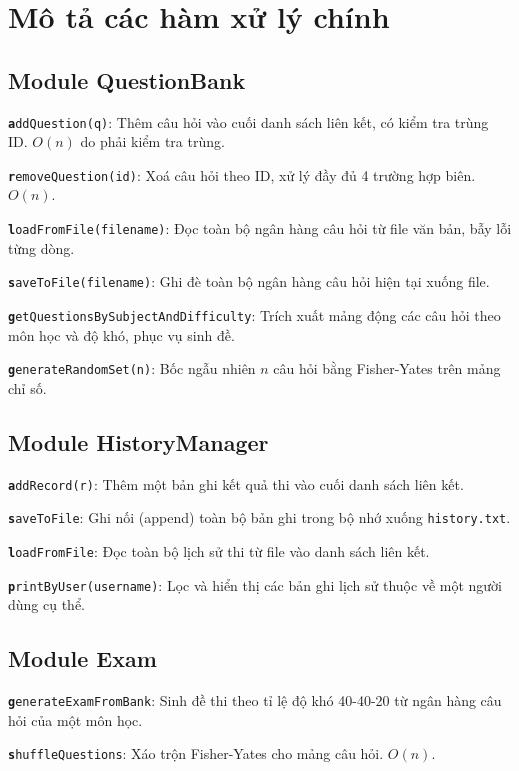 \documentclass[11pt]{report}
\begin{document}
\chapter{Mô tả các hàm xử lý chính}

\section{Module QuestionBank}

\texttt{\textbf addQuestion(q)}: Thêm câu hỏi vào cuối danh sách liên kết, có kiểm tra trùng ID. $O(n)$ do phải kiểm tra trùng. 

\texttt{\textbf removeQuestion(id)}: Xoá câu hỏi theo ID, xử lý đầy đủ 4 trường hợp biên. $O(n)$. 

\texttt{\textbf loadFromFile(filename)}: Đọc toàn bộ ngân hàng câu hỏi từ file văn bản, bẫy lỗi từng dòng. 

\texttt{\textbf saveToFile(filename)}: Ghi đè toàn bộ ngân hàng câu hỏi hiện tại xuống file. 

\texttt{\textbf getQuestionsBySubjectAndDifficulty}: Trích xuất mảng động các câu hỏi theo môn học và độ khó, phục vụ sinh đề. 

\texttt{\textbf generateRandomSet(n)}: Bốc ngẫu nhiên $n$ câu hỏi bằng Fisher-Yates trên mảng chỉ số.

\section{Module HistoryManager}

\texttt{\textbf addRecord(r)}: Thêm một bản ghi kết quả thi vào cuối danh sách liên kết. 

\texttt{\textbf saveToFile}: Ghi nối (append) toàn bộ bản ghi trong bộ nhớ xuống \texttt{history.txt}. 

\texttt{\textbf loadFromFile}: Đọc toàn bộ lịch sử thi từ file vào danh sách liên kết. 

\texttt{\textbf printByUser(username)}: Lọc và hiển thị các bản ghi lịch sử thuộc về một người dùng cụ thể. 

\section{Module Exam}

\texttt{\textbf generateExamFromBank}: Sinh đề thi theo tỉ lệ độ khó 40-40-20 từ ngân hàng câu hỏi của một môn học. 

\texttt{\textbf shuffleQuestions}: Xáo trộn Fisher-Yates cho mảng câu hỏi. $O(n)$. 
\end{document}
